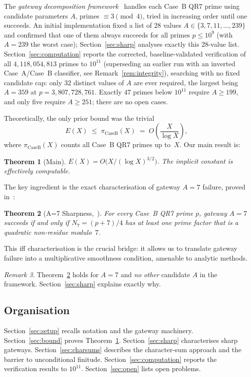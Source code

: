 \documentclass[12pt]{amsart}
\newtheorem{theorem}{Theorem}[section]
\theoremstyle{definition}
\theoremstyle{remark}
\newtheorem{remark}[theorem]{Remark}
\begin{document}
The \emph{gateway decomposition framework}~\cite{ES-paper} handles
each Case~B QR7 prime using candidate parameters $A$, primes
$\equiv 3 \pmod{4}$, tried in increasing order until one succeeds.
An initial implementation fixed a list of $28$ values
$A \in \{3,7,11,\ldots,239\}$ and confirmed that one of them always
succeeds for all primes $p \le 10^9$ (with $A = 239$ the worst case);
Section~\ref{sec:sharp} analyses exactly this $28$-value list.
Section~\ref{sec:computation} reports the corrected, baseline-validated
verification of all $4{,}118{,}054{,}813$ primes to $10^{11}$
(superseding an earlier run with an inverted Case~A/Case~B classifier,
see Remark~\ref{rem:integrity}), searching with no fixed candidate cap:
only $32$ distinct values of $A$ are ever required, the largest being
$A = 359$ at $p = 3{,}807{,}728{,}761$. Exactly $47$ primes below
$10^{11}$ require $A \ge 199$, and only five require $A \ge 251$; there
are no open cases.

Theoretically, the only prior bound was the trivial
\[
  E(X) \;\le\; \pi_{\mathrm{CaseB}}(X) \;=\; O\!\left(\frac{X}{\log X}\right),
\]
where $\pi_{\mathrm{CaseB}}(X)$ counts all Case~B QR7 primes up to~$X$.
Our main result is:

\begin{theorem}[Main]\label{thm:main}
$E(X) = O\bigl(X / (\log X)^{3/2}\bigr)$.
The implicit constant is effectively computable.
\end{theorem}

The key ingredient is the exact characterisation of gateway $A=7$
failure, proved in~\cite{closure-paper}:

\begin{theorem}[A=7 Sharpness,~{\cite[Theorem~5.2]{closure-paper}}]
\label{thm:a7sharp}
For every Case~B QR7 prime $p$, gateway $A=7$ succeeds if and only if
$N_7 = (p+7)/4$ has at least one prime factor that is a quadratic
non-residue modulo~$7$.
\end{theorem}

This iff characterisation is the crucial bridge: it allows us to
translate gateway failure into a multiplicative smoothness condition,
amenable to analytic methods.

\begin{remark}
Theorem~\ref{thm:a7sharp} holds for $A=7$ and \emph{no other} candidate
$A$ in the framework.  Section~\ref{sec:sharp} explains exactly why.
\end{remark}

\subsection*{Organisation}
Section~\ref{sec:setup} recalls notation and the gateway machinery.
Section~\ref{sec:bound} proves Theorem~\ref{thm:main}.
Section~\ref{sec:sharp} characterises sharp gateways.
Section~\ref{sec:charsums} describes the character-sum approach and
the barrier to unconditional finitude.
Section~\ref{sec:computation} reports the verification results to $10^{11}$.
Section~\ref{sec:open} lists open problems.
\end{document}
